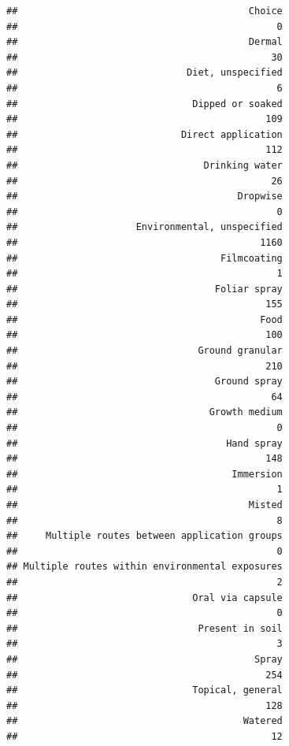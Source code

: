 \documentclass[
  12pt,
]{article}
\begin{document}
\begin{verbatim}
##                                         Choice 
##                                              0 
##                                         Dermal 
##                                             30 
##                              Diet, unspecified 
##                                              6 
##                               Dipped or soaked 
##                                            109 
##                             Direct application 
##                                            112 
##                                 Drinking water 
##                                             26 
##                                       Dropwise 
##                                              0 
##                     Environmental, unspecified 
##                                           1160 
##                                    Filmcoating 
##                                              1 
##                                   Foliar spray 
##                                            155 
##                                           Food 
##                                            100 
##                                Ground granular 
##                                            210 
##                                   Ground spray 
##                                             64 
##                                  Growth medium 
##                                              0 
##                                     Hand spray 
##                                            148 
##                                      Immersion 
##                                              1 
##                                         Misted 
##                                              8 
##     Multiple routes between application groups 
##                                              0 
## Multiple routes within environmental exposures 
##                                              2 
##                               Oral via capsule 
##                                              0 
##                                Present in soil 
##                                              3 
##                                          Spray 
##                                            254 
##                               Topical, general 
##                                            128 
##                                        Watered 
##                                             12
\end{verbatim}
\end{document}
